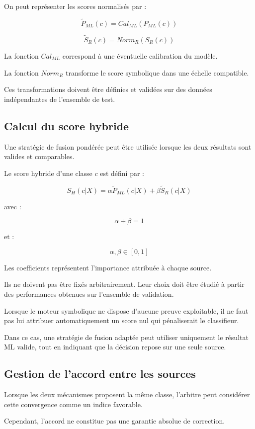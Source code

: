 On peut représenter les scores normalisés par :

\[
\widetilde{P}_{ML}(c)
=
Cal_{ML}(P_{ML}(c))
\]

\[
\widetilde{S}_{R}(c)
=
Norm_R(S_R(c))
\]

La fonction $Cal_{ML}$ correspond à une éventuelle calibration du modèle.

La fonction $Norm_R$ transforme le score symbolique dans une échelle compatible.

Ces transformations doivent être définies et validées sur des données indépendantes de l'ensemble de test.

\subsection{Calcul du score hybride}

Une stratégie de fusion pondérée peut être utilisée lorsque les deux résultats sont valides et comparables.

Le score hybride d'une classe $c$ est défini par :

\[
S_H(c|X)=
\alpha\widetilde{P}_{ML}(c|X)
+
\beta\widetilde{S}_{R}(c|X)
\]

avec :

\[
\alpha+\beta=1
\]

et :

\[
\alpha,\beta\in[0,1]
\]

Les coefficients représentent l'importance attribuée à chaque source.

Ils ne doivent pas être fixés arbitrairement. Leur choix doit être étudié à partir des performances obtenues sur l'ensemble de validation.

Lorsque le moteur symbolique ne dispose d'aucune preuve exploitable, il ne faut pas lui attribuer automatiquement un score nul qui pénaliserait le classifieur.

Dans ce cas, une stratégie de fusion adaptée peut utiliser uniquement le résultat ML valide, tout en indiquant que la décision repose sur une seule source.

\subsection{Gestion de l'accord entre les sources}

Lorsque les deux mécanismes proposent la même classe, l'arbitre peut considérer cette convergence comme un indice favorable.

Cependant, l'accord ne constitue pas une garantie absolue de correction.

